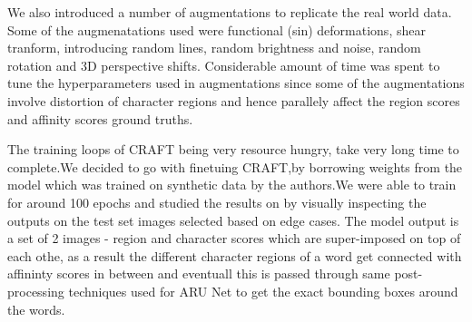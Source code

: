 We also introduced a number of augmentations to replicate the real world data. Some of the augmenatations used were functional (sin) deformations, shear tranform, introducing random lines, random brightness and noise, random rotation and 3D perspective shifts. Considerable amount of time was spent to tune the hyperparameters used in augmentations since some of the augmentations involve distortion of character regions and hence parallely affect the region scores and affinity scores ground truths.

The training loops of CRAFT being very resource hungry, take very long time to complete.We decided to go with finetuing CRAFT,by borrowing weights from the model which was trained on synthetic data by the authors.We were able to train for around 100 epochs and studied the results on by visually inspecting the outputs on the test set images selected based on edge cases. 
The model output is a set of 2 images - region and character scores which are super-imposed on top of each othe, as a result the different character regions of a word get connected with affininty scores in between and eventuall this is passed through same post-processing techniques used for ARU Net to get the exact bounding boxes around the words.



